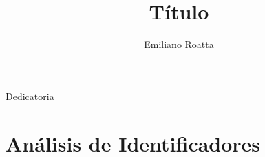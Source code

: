 \documentclass[a4paper,11pt,twoside,openright]{book}
\title{Título}
\author{Emiliano Roatta}
\begin{document}
\frontmatter

\maketitle

\begin{flushright}
\null{}
  Dedicatoria
\null
\end{flushright}



\tableofcontents
\listoffigures
\listoftables
\listofalgorithms

\mainmatter
\chapter{Análisis de Identificadores}







\backmatter
\end{document}
